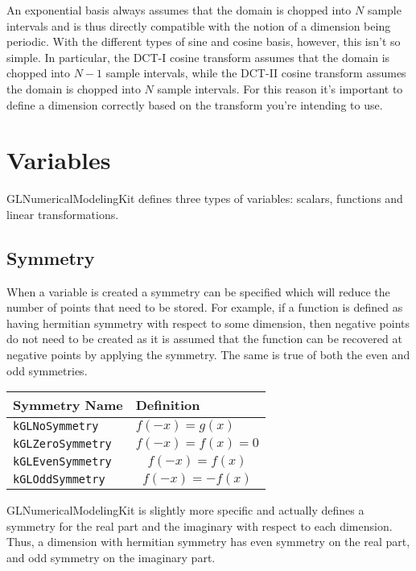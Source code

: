 \documentclass[11pt]{article}
\begin{document}
An exponential basis always assumes that the domain is chopped into $N$ sample intervals and is thus directly compatible with the notion of a dimension being periodic. With the different types of sine and cosine basis, however, this isn't so simple. In particular, the DCT-I cosine transform assumes that the domain is chopped into $N-1$ sample intervals, while the DCT-II cosine transform assumes the domain is chopped into $N$ sample intervals. For this reason it's important to define a dimension correctly based on the transform you're intending to use.

%
%
\section{Variables}

GLNumericalModelingKit defines three types of variables: scalars, functions and linear transformations. 

\subsection{Symmetry}

When a variable is created a symmetry can be specified which will reduce the number of points that need to be stored. For example, if a function is defined as having hermitian symmetry with respect to some dimension, then negative points do not need to be created as it is assumed that the function can be recovered at negative points by applying the symmetry. The same is true of both the even and odd symmetries.

\begin{tabular}{lL}
      \hline
      Symmetry Name & Definition \tabularnewline \hline \hline
      \verb"kGLNoSymmetry" &  $f(-x)=g(x)$ \tabularnewline
      \verb"kGLZeroSymmetry" &  \[ f(-x) = f(x) = 0 \] \tabularnewline
      \verb"kGLEvenSymmetry" &  \[ f(-x) = f(x) \] \tabularnewline
      \verb"kGLOddSymmetry" &  \[ f(-x) = - f(x)  \] \tabularnewline
      \hline
\end{tabular}

GLNumericalModelingKit is slightly more specific and actually defines a symmetry for the real part and the imaginary with respect to each dimension. Thus, a dimension with hermitian symmetry has even symmetry on the real part, and odd symmetry on the imaginary part.

%
%
\end{document}

